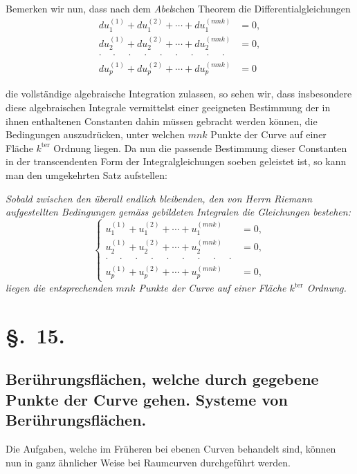 \documentclass{article}
\begin{document}
Bemerken wir nun, dass nach dem \emph{Abel}schen Theorem die Differentialgleichungen
\[
\begin{aligned}
du_{1}^{(1)}+du_{1}^{(2)}+\cdots+du_{1}^{(mnk)} &= 0,\\
du_{2}^{(1)}+du_{2}^{(2)}+\cdots+du_{2}^{(mnk)} &= 0,\\
\cdot\quad\cdot\quad\cdot\quad\cdot\quad\cdot\quad\cdot\quad\cdot\quad\cdot\quad\cdot &\\
du_{p}^{(1)}+du_{p}^{(2)}+\cdots+du_{p}^{(mnk)} &= 0
\end{aligned}
\]

die vollständige algebraische Integration zulassen, so sehen wir, dass insbesondere diese algebraischen Integrale vermittelst einer geeigneten Bestimmung der in ihnen enthaltenen Constanten dahin müssen gebracht werden können, die Bedingungen auszudrücken, unter welchen $mnk$ Punkte der Curve auf einer Fläche $k^{\text{ter}}$ Ordnung liegen. Da nun die passende Bestimmung dieser Constanten in der transcendenten Form der Integralgleichungen soeben geleistet ist, so kann man den umgekehrten Satz aufstellen:

\emph{Sobald zwischen den überall endlich bleibenden, den von Herrn Riemann aufgestellten Bedingungen gemäss gebildeten Integralen die Gleichungen bestehen:}
\[
\left\{
\begin{aligned}
u_{1}^{(1)}+u_{1}^{(2)}+\cdots+u_{1}^{(mnk)} &= 0,\\
u_{2}^{(1)}+u_{2}^{(2)}+\cdots+u_{2}^{(mnk)} &= 0,\\
\cdot\quad\cdot\quad\cdot\quad\cdot\quad\cdot\quad\cdot\quad\cdot\quad\cdot\quad\cdot &\\
u_{p}^{(1)}+u_{p}^{(2)}+\cdots+u_{p}^{(mnk)} &= 0,
\end{aligned}
\right.\tag{24.}
\]
\emph{liegen die entsprechenden $mnk$ Punkte der Curve auf einer Fläche $k^{\text{ter}}$ Ordnung.}

\section*{§.~15.}

\subsection*{Berührungsflächen, welche durch gegebene Punkte der Curve gehen. Systeme von Berührungsflächen.}

Die Aufgaben, welche im Früheren bei ebenen Curven behandelt sind, können nun in ganz ähnlicher Weise bei Raumcurven durchgeführt werden.
\end{document}

